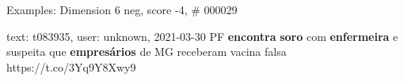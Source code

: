 \begin{frame}{Examples: Dimension 6 neg, score -4, \# 000029}
\footnotesize
\begin{alertblock}{text: t083935, user: unknown, 2021-03-30}
PF \textbf{encontra} \textbf{soro} com \textbf{enfermeira} e suspeita que 
\textbf{empresários} de MG receberam vacina falsa https://t.co/3Yq9Y8Xwy9 
\end{alertblock}
\end{frame}
